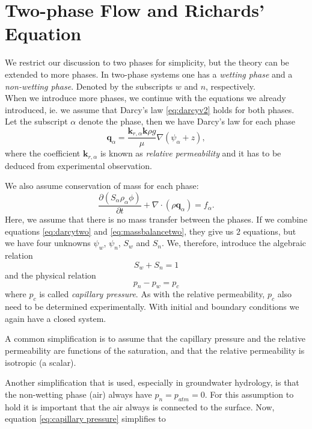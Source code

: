 \documentclass[../Main/main.tex]{subfiles}
\begin{document}
\section*{Two-phase Flow and Richards' Equation}
We restrict our discussion to two phases for simplicity, but the theory can be extended to more phases. In two-phase systems one has a \emph{wetting phase} and a \emph{non-wetting phase}. Denoted by the subscripts $w$ and $n$, respectively. \\
When we introduce more phases, we continue with the equations we already introduced, ie. we assume that Darcy's law  \eqref{eq:darcyv2} holds for both phases. Let the subscript $\alpha$ denote the phase, then we have Darcy's law for each phase
\begin{equation}\label{eq:darcytwo}
	\bm{q}_{\alpha} = \frac{\bm{k}_{r,\alpha}\bm{k}\rho g}{\mu}\nabla(\psi_{\alpha} + z),
\end{equation}
where the coefficient $\bm{k}_{r,\alpha}$ is known as \emph{relative permeability} and it has to be deduced from experimental observation. \par We also assume conservation of mass for each phase:
\begin{equation}\label{eq:massbalancetwo}
	\frac{\partial (S_{\alpha}\rho_{\alpha} \phi) }{\partial t} + \nabla \cdot (\rho \bm{q}_{\alpha}) = f_{\alpha}.
\end{equation}
Here, we assume that there is no mass transfer between the phases.
If we combine equations \eqref{eq:darcytwo} and \eqref{eq:massbalancetwo}, they give us $2$ equations, but we have four unknowns $\psi_w$, $\psi_n$, $S_w$ and $S_n$. We, therefore, introduce the algebraic relation
\begin{equation*}
	S_w + S_n = 1
\end{equation*}
and the physical relation
\begin{equation}\label{eq:capillary pressure}
	p_n-p_w = p_c
\end{equation}
where $p_c$ is called \emph{capillary pressure}. As with the relative permeability, $p_c$ also need to be determined experimentally.
With initial and boundary conditions we again have a closed system.\par
A common simplification is to assume that the capillary pressure and the relative permeability are functions of the saturation, and that the relative permeability is isotropic (a scalar). \par
Another simplification that is used, especially in groundwater hydrology, is that the non-wetting phase (air) always have $p_n = p_{atm}=0$. For this assumption to hold it is important that the air always is connected to the surface. Now, equation \eqref{eq:capillary pressure} simplifies to
\end{document}
